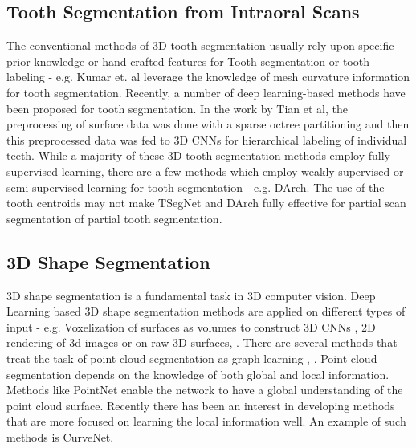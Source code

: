 \documentclass[letterpaper, 10 pt, conference]{ieeeconf}  %
\begin{document}
\subsection{Tooth Segmentation from Intraoral Scans}
The conventional methods of 3D tooth segmentation usually rely upon specific prior knowledge or hand-crafted features for Tooth segmentation or tooth labeling - e.g. Kumar et. al\cite{kumar2011improved} leverage the knowledge of mesh curvature information for tooth segmentation. %
Recently, a number of deep learning-based methods have been proposed for tooth segmentation. %
In the work by Tian et al\cite{tian2019automatic}, the preprocessing of surface data was done with a sparse octree partitioning and then this preprocessed data was fed to 3D CNNs for hierarchical labeling of individual teeth. While a majority of these 3D tooth segmentation methods employ fully supervised learning, there are a few methods which employ weakly supervised or semi-supervised learning for tooth segmentation - e.g. DArch\cite{qiu2022darch}. %
The use of the tooth centroids may not make TSegNet and DArch fully effective for partial scan segmentation of partial tooth segmentation. 
\subsection{3D Shape Segmentation}
3D shape segmentation is a fundamental task in 3D computer vision. %
Deep Learning based 3D shape segmentation methods are applied on different types of input - e.g. Voxelization of surfaces as volumes to construct 3D CNNs \cite{wu20153d}, 2D rendering of 3d images \cite{su2015multi}%
or on raw 3D surfaces\cite{qi2017pointnet}, \cite{qi2017pointnet++}. There are several methods that treat the task of point cloud segmentation as graph learning %
\cite{wang2018local}, \cite{wang2019graph}. Point cloud segmentation depends on the knowledge of both global and local information. Methods like PointNet\cite{qi2017pointnet} enable the network to have a global understanding of the point cloud surface. Recently there has been an interest in developing methods that are more focused on learning the local information well. An example of such methods is CurveNet\cite{xiang2021walk}.%
\end{document}

